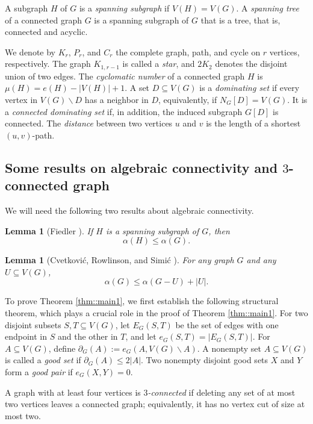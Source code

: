 \documentclass[11pt]{article}
\newtheorem{lem}[thm]{Lemma}
\theoremstyle{definition}
\begin{document}
A subgraph $H$ of $G$ is a \emph{spanning subgraph} if $V(H)=V(G)$. A \emph{spanning tree} of a connected graph $G$ is a spanning subgraph of $G$ that is a tree, that is, connected and acyclic.

We denote by $K_r$, $P_r$, and $C_r$ the complete graph, path, and cycle on $r$ vertices, respectively. The graph $K_{1,r-1}$ is called a \emph{star}, and $2K_2$ denotes the disjoint union of two edges. The \emph{cyclomatic number} of a connected graph $H$ is $\mu(H)=e(H)-|V(H)|+1$.
A set $D\subseteq V(G)$ is a \emph{dominating set} if every vertex in $V(G)\backslash D$ has a neighbor in $D$, equivalently, if $N_G[D]=V(G)$. It is a \emph{connected dominating set} if, in addition, the induced subgraph $G[D]$ is connected. The \emph{distance} between two vertices $u$ and $v$ is the length of a shortest $(u,v)$-path.

\subsection{Some results on algebraic connectivity and $3$-connected graph}
We will need the following two results about algebraic connectivity.

\begin{lem}[Fiedler \cite{F73}]\label{lem::1}
  If $H$ is a spanning subgraph of $G$, then
  \[
    \alpha(H)\leq \alpha(G).
  \]
\end{lem}

\begin{lem}[Cvetkovi\'{c}, Rowlinson, and Simi\'{c} \cite{DPS10}]\label{lem::2}
  For any graph $G$ and any $U\subseteq V(G)$,
  \[
    \alpha(G)\leq \alpha(G-U)+|U|.
  \]
\end{lem}

To prove Theorem \ref{thm::main1}, we first establish the following structural theorem, which plays a crucial role in the proof of Theorem \ref{thm::main1}. For two disjoint subsets $S,T\subseteq V(G)$, let $E_G(S,T)$ be the set of edges with one endpoint in $S$ and the other in $T$, and let $e_G(S,T)=|E_G(S,T)|$. For $A\subseteq V(G)$, define $\partial_G(A):=e_G(A,V(G)\backslash A)$.
A nonempty set $A\subseteq V(G)$ is called a \emph{good set} if $\partial_G(A)\leq 2|A|$. Two nonempty disjoint good sets $X$ and $Y$ form a \emph{good pair} if $e_G(X,Y)=0$.

A graph with at least four vertices is \emph{$3$-connected} if deleting any set of at most two vertices leaves a connected graph; equivalently, it has no vertex cut of size at most two.
\end{document}

